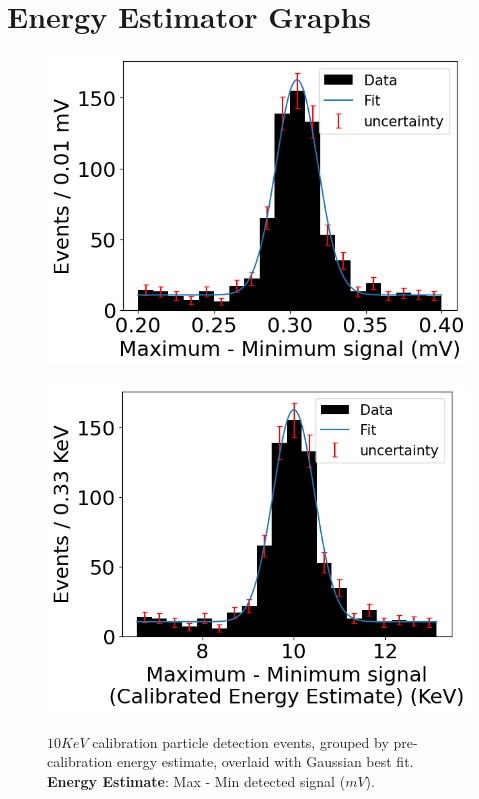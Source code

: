 \section{Energy Estimator Graphs}\label{sec::energyEst}
\begin{figure}[H]
	\begin{minipage}[t]{0.45\linewidth}
		\begin{center}
            \label{fig::amp1}
			\includegraphics[width=\textwidth]{figures/amp1.png}
			\caption{
                $10\unit{KeV}$ calibration particle detection events, grouped by pre-calibration energy estimate, overlaid with Gaussian best fit.\\
                \textbf{Energy Estimate}: Max - Min detected signal ($\unit{mV}$).
            }
		\end{center}
	\end{minipage}
    \hfill
	\begin{minipage}[t]{0.45\linewidth}
		\begin{center}
            \label{fig::amp1--cal}
			\includegraphics[width=\textwidth]{figures/amp1--calibrated.png}

\end{center}
\end{minipage}
\end{figure}
